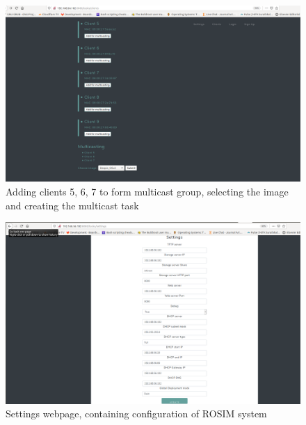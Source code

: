 \documentclass[a4paper,12pt]{article}
\begin{document}
\begin{figure}
    \centering
    \includegraphics[width=\linewidth]{Multicast.png}
    \caption{Adding clients 5, 6, 7 to form multicast group, selecting the image and creating the multicast task}
    \label{multicast_group}
\end{figure}

\begin{figure}
    \centering
    \includegraphics[width=\linewidth]{Settings.png}
    \caption{Settings webpage, containing configuration of ROSIM system}
    \label{settings}
\end{figure}


\newpage 
\end{document}
